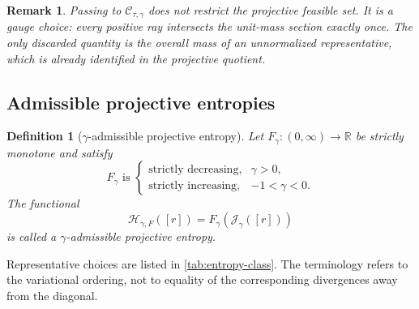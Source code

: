 \documentclass[pdflatex,sn-mathphys-num]{sn-jnl}
\theoremstyle{thmstyleone}
\theoremstyle{thmstyletwo}
\newtheorem{remark}{Remark}
\theoremstyle{thmstylethree}
\newtheorem{definition}{Definition}
\newcommand{\R}{\mathbb{R}}
\newcommand{\calC}{\mathcal{C}}
\newcommand{\calH}{\mathcal{H}}
\newcommand{\calJ}{\mathcal{J}}
\begin{document}
\begin{remark}
Passing to $\calC_{\tau,\gamma}$ does not restrict the projective feasible set. It is a gauge choice: every positive ray intersects the unit-mass section exactly once. The only discarded quantity is the overall mass of an unnormalized representative, which is already identified in the projective quotient.
\end{remark}

\subsection{Admissible projective entropies}

\begin{definition}[$\gamma$-admissible projective entropy]\label{def:admissible}
Let $F_\gamma:(0,\infty)\to\R$ be strictly monotone and satisfy
\[
 F_\gamma \text{ is }
 \begin{cases}
 \text{strictly decreasing},&\gamma>0,\\
 \text{strictly increasing},&-1<\gamma<0.
 \end{cases}
\]
The functional
\begin{equation}
 \calH_{\gamma,F}([r])
 =F_\gamma\!\left(\calJ_\gamma([r])\right)
\label{eq:admissible-entropy}
\end{equation}
is called a $\gamma$-admissible projective entropy.
\end{definition}

Representative choices are listed in \cref{tab:entropy-class}. The terminology refers to the variational ordering, not to equality of the corresponding divergences away from the diagonal.
\end{document}
